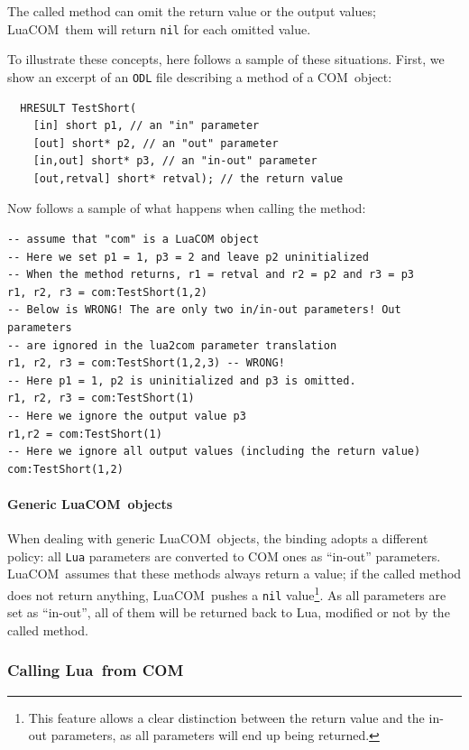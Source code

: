 \documentclass[11pt,a4paper,english]{report}
\newcommand{\ident}[1]{\mbox{\texttt{#1}}}
\newcommand{\techname}[1]{\mbox{#1}}
\newcommand{\lua}{\techname{Lua}}
\newcommand{\com}{\techname{COM}}
\newcommand{\luacom}{\techname{LuaCOM}}
\begin{document}
The called method can omit the return value or the output values;
\luacom\ them will return \ident{nil} for each omitted value.

To illustrate these concepts, here follows a sample of these
situations. First, we show an excerpt of an \ident{ODL} file
describing a method of a \com\ object:

\begin{verbatim}
  HRESULT TestShort(
    [in] short p1, // an "in" parameter
    [out] short* p2, // an "out" parameter
    [in,out] short* p3, // an "in-out" parameter
    [out,retval] short* retval); // the return value
\end{verbatim}

  Now follows a sample of what happens when calling the method:

\begin{verbatim}
-- assume that "com" is a LuaCOM object
-- Here we set p1 = 1, p3 = 2 and leave p2 uninitialized
-- When the method returns, r1 = retval and r2 = p2 and r3 = p3
r1, r2, r3 = com:TestShort(1,2)
-- Below is WRONG! The are only two in/in-out parameters! Out parameters
-- are ignored in the lua2com parameter translation
r1, r2, r3 = com:TestShort(1,2,3) -- WRONG!
-- Here p1 = 1, p2 is uninitialized and p3 is omitted.
r1, r2, r3 = com:TestShort(1)
-- Here we ignore the output value p3
r1,r2 = com:TestShort(1)
-- Here we ignore all output values (including the return value)
com:TestShort(1,2)
\end{verbatim}

\paragraph{Generic \luacom\ objects}

When dealing with generic \luacom\ objects, the binding adopts a
different policy: all \ident{Lua} parameters are converted to COM ones
as ``in-out'' parameters. \luacom\ assumes that these methods always
return a value; if the called method does not return anything,
\luacom\ pushes a \ident{nil} value\footnote{This feature allows a
clear distinction between the return value and the in-out parameters,
as all parameters will end up being returned.}. As all parameters are
set as ``in-out'', all of them will be returned back to Lua, modified
or not by the called method.


\subsubsection{Calling \lua\ from \com}
\end{document}
